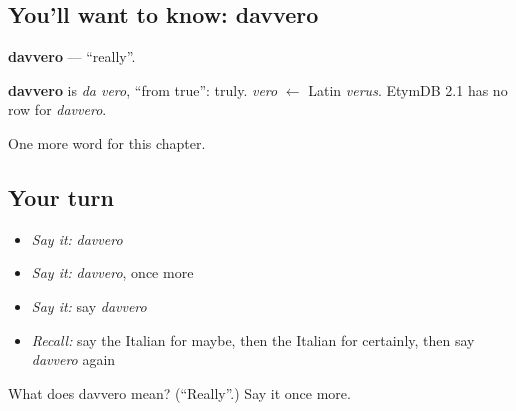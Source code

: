 \subsection*{You'll want to know: davvero}
\textbf{davvero} — \textquotedblleft{}really\textquotedblright{}.

\begin{cousinweb}
\textbf{davvero} is \emph{da vero}, \textquotedblleft{}from true\textquotedblright{}: truly. \emph{vero} $\leftarrow$ Latin \emph{verus}. EtymDB 2.1 has no row for \emph{davvero}.
\end{cousinweb}

\begin{grammarlens}[title={What you've built}]
One more word for this chapter.
\end{grammarlens}

\subsection*{Your turn}
\begin{itemize}
\raggedright
  \item \emph{Say it:} \emph{davvero}
  \item \emph{Say it:} \emph{davvero}, once more
  \item \emph{Say it:} say \emph{davvero}
  \item \emph{Recall:} say the Italian for maybe, then the Italian for certainly, then say \emph{davvero} again
\end{itemize}

\begin{tcolorbox}[breakable,colback=teal!4,colframe=teal!35!black,title={Before you move on}]
What does davvero mean? (\textquotedblleft{}Really\textquotedblright{}.) Say it once more.
\end{tcolorbox}
